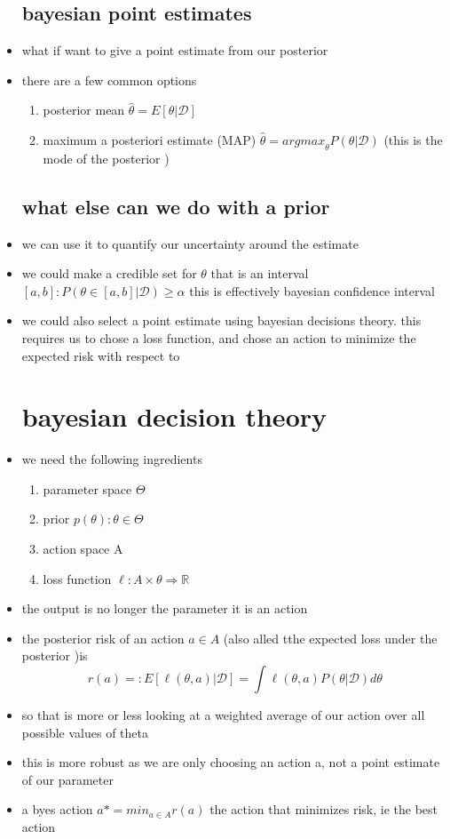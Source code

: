 \documentclass{article}
\begin{document}
\begin{itemize}
\subsection*{bayesian point estimates}
\item what if want to give a point estimate from our posterior 
\item there are a few common options
\begin{enumerate}
    \item posterior mean $\hat{\theta}=E[\theta|\mathcal{D}]$
    \item maximum a posteriori estimate (MAP) $\hat{\theta}={argmax}_{\theta}P(\theta|\mathcal{D})$ (this is the mode of the posterior )
\end{enumerate}
\subsection*{what else can we do with a prior}
\item we can use it to quantify our uncertainty around the estimate 
\item we could make a credible set for $\theta$ that is an interval $[a,b]:P(\theta\in [a,b]|\mathcal{D})\geq \alpha$ this is effectively bayesian confidence interval
\item we could also select a point estimate using bayesian decisions theory. this requires us to chose a loss function, and chose an action to minimize the expected risk with respect to  
\section{bayesian decision theory}
\item we need the following ingredients 
\begin{enumerate}
    \item parameter space $\Theta$
    \item prior $p(\theta):\theta\in\Theta$
    \item action space A
    \item loss function $\ell:A\times \theta \Rightarrow \mathbb{R}$
\end{enumerate}
\item the output is no longer the parameter it is an action 
\item the posterior risk of an action $a\in A$ (also alled tthe expected loss under the posterior )is $$r(a)=:E[\ell(\theta, a)|\mathcal{D}]=\int \ell(\theta,a)P(\theta|\mathcal{D})d\theta$$
\item so that is more or less looking at a weighted average of our action over all possible values of theta
\item this is more robust as we are only choosing an action a, not a point estimate of our parameter 
\item a byes action $a*=min_{a\in A}r(a)$ the action that minimizes risk, ie the best action 

\end{itemize}
\end{document}
